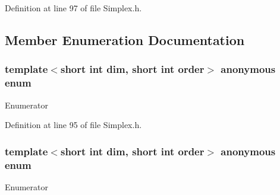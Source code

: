 Definition at line 97 of file Simplex.\+h.



\subsection{Member Enumeration Documentation}
\hypertarget{classmodel_1_1_simplex_a7286fd954404dc7a5db4e651ca79f98c}{}\subsubsection[{anonymous enum}]{\setlength{\rightskip}{0pt plus 5cm}template$<$short int dim, short int order$>$ anonymous enum}\label{classmodel_1_1_simplex_a7286fd954404dc7a5db4e651ca79f98c}
\begin{Desc}
\item[Enumerator]\par
\begin{description}
\item[{\em 
\hypertarget{classmodel_1_1_simplex_a7286fd954404dc7a5db4e651ca79f98ca92a060ca173e4145b92edcbdca5f0b97}{}n\+Vertices\label{classmodel_1_1_simplex_a7286fd954404dc7a5db4e651ca79f98ca92a060ca173e4145b92edcbdca5f0b97}
}]\end{description}
\end{Desc}


Definition at line 95 of file Simplex.\+h.

\hypertarget{classmodel_1_1_simplex_a2b1d678a5e859ed6ba64f7b92f48d8fa}{}\subsubsection[{anonymous enum}]{\setlength{\rightskip}{0pt plus 5cm}template$<$short int dim, short int order$>$ anonymous enum}\label{classmodel_1_1_simplex_a2b1d678a5e859ed6ba64f7b92f48d8fa}
\begin{Desc}
\item[Enumerator]\par
\begin{description}
\item[{\em 
\hypertarget{classmodel_1_1_simplex_a2b1d678a5e859ed6ba64f7b92f48d8faa6946a68a30619094b8c50c275212e598}{}n\+Faces\label{classmodel_1_1_simplex_a2b1d678a5e859ed6ba64f7b92f48d8faa6946a68a30619094b8c50c275212e598}
}]\end{description}
\end{Desc}


